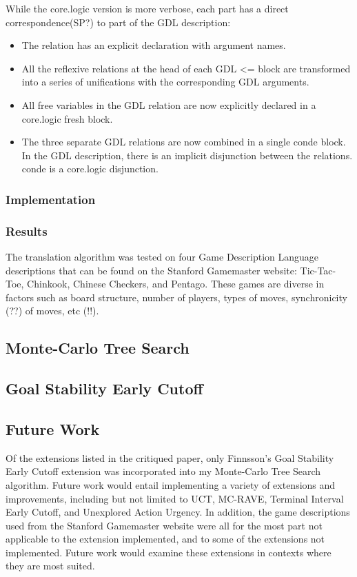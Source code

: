 \documentclass[letterpaper]{article}
\begin{document}
While the core.logic version is more verbose, each part has a direct correspondence(SP?) to part of the GDL description:
\begin{itemize}
\item The relation has an explicit declaration with argument names.
\item All the reflexive relations at the head of each GDL \textless= block are transformed into a series of unifications with the corresponding GDL arguments. 
\item All free variables in the GDL relation are now explicitly declared in a core.logic fresh block.
\item The three separate GDL relations are now combined in a single conde block. In the GDL description, there is an implicit disjunction between the relations. conde is a core.logic disjunction.
\end{itemize}

\subsubsection{Implementation}

\subsubsection{Results}
The translation algorithm was tested on four Game Description Language descriptions that can be found on the Stanford Gamemaster website: Tic-Tac-Toe, Chinkook, Chinese Checkers, and Pentago. These games are diverse in factors such as board structure, number of players, types of moves, synchronicity (??) of moves, etc (!!).

\subsection{Monte-Carlo Tree Search}

\subsection{Goal Stability Early Cutoff}

\subsection{Future Work}

Of the extensions listed in the critiqued paper, only Finnsson's Goal Stability Early Cutoff extension was incorporated into my Monte-Carlo Tree Search algorithm. Future work would entail implementing a variety of extensions and improvements, including but not limited to UCT, MC-RAVE, Terminal Interval Early Cutoff, and Unexplored Action Urgency. In addition, the game descriptions used from the Stanford Gamemaster website were all for the most part not applicable to the extension implemented, and to some of the extensions not implemented. Future work would examine these extensions in contexts where they are most suited.
\end{document}
